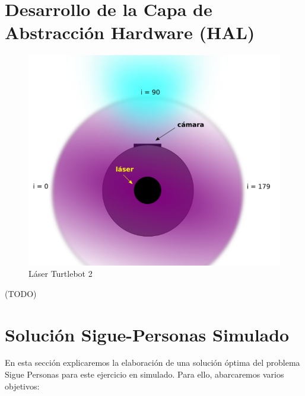 \section{Desarrollo de la Capa de Abstracción Hardware (HAL)}
\label{sec:turtlebot2_hal_simulado}

\begin{figure} [H]
  \begin{center}
    \includegraphics[width=15cm]{imagenes/vista-planta-turtlebot2.png}
  \end{center}
  \caption[Láser Turtlebot 2]{Láser Turtlebot 2}
  \label{fig:vista_planta_turtlebot2}
\end{figure}
(TODO)




\section{Solución Sigue-Personas Simulado}
\label{sec:sigue_personas_simulado}

En esta sección explicaremos la elaboración de una solución óptima del problema Sigue Personas para este ejercicio en simulado. Para ello, abarcaremos varios objetivos:
